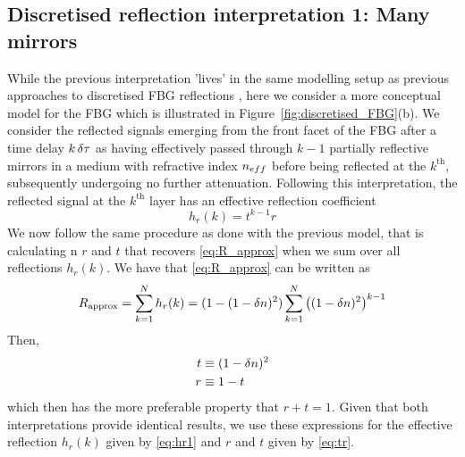 \subsection{Discretised reflection interpretation 1: Many mirrors}
%
While the previous interpretation 'lives' in the same modelling setup as previous approaches to discretised FBG reflections \cite{ghiringhelli2002time, capmany2007synthesis}, 
here we consider a more conceptual model for the FBG which is illustrated in Figure~\ref{fig:discretised_FBG}(b). 
We consider the reflected signals emerging from the front facet of the FBG after a time delay $k \, \delta \tau$ as having effectively passed through $k-1$ partially reflective mirrors in a medium with refractive index $n_{eff}$ before being reflected at the $k^\text{th}$, 
subsequently undergoing no further attenuation. 
Following this interpretation, the reflected signal at the $k^\text{th}$ layer has an effective reflection coefficient
%
\begin{equation}
    \label{eq:hr1}
    h_r(k) = t^{k-1}r
\end{equation}
%
We now follow the same procedure as done with the previous model, that is calculating n $r$ and $t$ that recovers \eqref{eq:R_approx} when we sum over all reflections $h_r(k)$. 
We have that \eqref{eq:R_approx} can be written as
%
\begin{equation*}
    R_\text{approx} = \sum_{k=1}^{N} h_r(k) = (1-(1-\delta n)^2)\sum_{k=1}^{N} \left((1-\delta n)^2\right)^{k-1}
\end{equation*}
%
Then,
%
\begin{align}
    \label{eq:tr}
    t &\equiv (1-\delta n)^2
    \\
    r &\equiv 1-t
\end{align}
%
which then has the more preferable property that $r+t=1$. 
Given that both interpretations provide identical results, we use these expressions for the effective reflection $h_r(k)$ given by \eqref{eq:hr1} and $r$ and $t$ given by \eqref{eq:tr}. 
%
%
